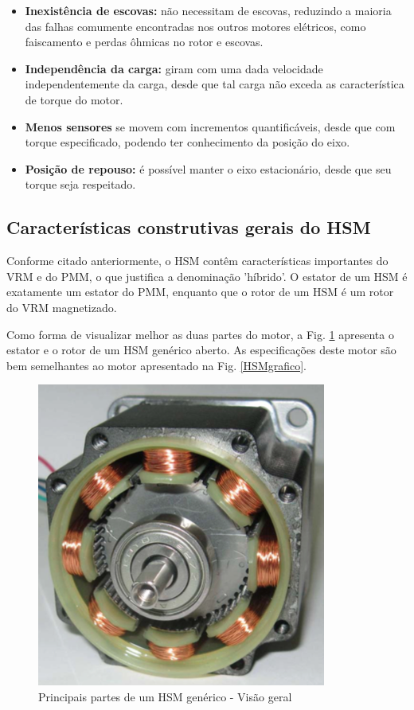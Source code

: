 \documentclass[portugues]{sobraep}
\begin{document}
	\begin{itemize}
		\item \textbf{Inexistência de escovas:} não necessitam de escovas, reduzindo a maioria das falhas comumente encontradas nos outros motores elétricos, como faiscamento e perdas ôhmicas no rotor e escovas.
		\item \textbf{Independência da carga:} giram com uma dada velocidade independentemente da carga, desde que tal carga não exceda as característica de torque do motor.
		\item \textbf{Menos sensores} se movem com incrementos quantificáveis, desde que com torque especificado, podendo ter conhecimento da posição do eixo.
		\item \textbf{Posição de repouso:} é possível manter o eixo estacionário, desde que seu torque seja respeitado. 
	\end{itemize}
	
	\subsection{Características construtivas gerais do HSM}
	
	Conforme citado anteriormente, o HSM contêm características importantes do VRM e do PMM, o que justifica a denominação 'híbrido'. O estator de um HSM é exatamente um estator do PMM, enquanto que o rotor de um HSM é um rotor do VRM magnetizado.
	
	Como forma de visualizar melhor as duas partes do motor, a Fig. \ref{HSMreal} apresenta o estator e o rotor de um HSM genérico aberto. As especificações deste motor são bem semelhantes ao motor apresentado na Fig. \ref{HSMgrafico}.
	
	\begin{figure}[!h]
		\centering
		\includegraphics[scale=.45]{Images/hsmreal1.png}
		\caption{Principais partes de um HSM genérico - Visão geral \cite{ieeeRusso}}
		\label{HSMreal}
	\end{figure} 
	
\end{document}
